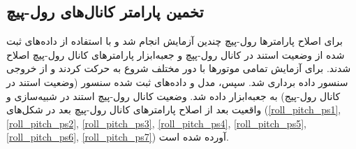 \subsection{تخمین پارامتر کانال‌های رول-پیچ}
برای اصلاح پارامترها رول-پیچ چندین آزمایش انجام شد و با استفاده از داده‌های ثبت شده از وضعیت استند در کانال رول-پپچ و جعبه‌ابزار
پارامترهای کانال رول-پیچ اصلاح شدند.
برای آزمایش تمامی موتورها با دور مختلف شروع به حرکت کردند و از خروجی سنسور داده برداری شد. سپس، مدل و  داده‌های ثبت شده سنسور (وضعیت استند در کانال رول-پیج)  به جعبه‌ابزار
داده شد. وضعیت کانال رول-پیچ استند در شبیه‌سازی و واقعیت بعد از اصلاح پارامترهای کانال‌ رول-پیچ بعد در شکل‌های
(\ref{roll_pitch_ps1}, \ref{roll_pitch_ps2}, \ref{roll_pitch_ps3}, \ref{roll_pitch_ps4}, \ref{roll_pitch_ps5}, \ref{roll_pitch_ps6}, \ref{roll_pitch_ps7})
آورده شده است.

